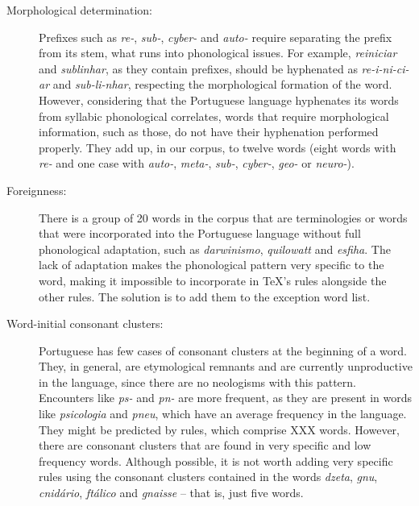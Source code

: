 \documentclass{article}
\begin{document}
\begin{description} 
    \item[Morphological determination:] Prefixes such as \emph{re-},
	\emph{sub-}, \emph{cyber-} and \emph{auto-} require separating the
	prefix from its stem, what runs into phonological issues. For example,
	\emph{reiniciar} and \emph{sublinhar}, as they contain prefixes, should
	be hyphenated as \emph{re-i-ni-ci-ar} and \emph{sub-li-nhar},
	respecting the morphological formation of the word. However,
	considering that the Portuguese language hyphenates its words from
	syllabic phonological correlates, words that require morphological
	information, such as those, do not have their hyphenation performed
	properly. They add up, in our corpus, to twelve words (eight words with
	\emph{re-} and one case with \emph{auto-}, \emph{meta-}, \emph{sub-},
	\emph{cyber-}, \emph{geo-} or \emph{neuro-}).

    \item[Foreignness:] There is a group of 20 words in the corpus that are
	terminologies or words that were incorporated into the Portuguese
	language without full phonological adaptation, such as
	\emph{darwinismo}, \emph{quilowatt} and \emph{esfiha}. The lack of
	adaptation makes the phonological pattern very specific to the word,
	making it impossible to incorporate in \TeX{}'s rules alongside the
	other rules. The solution is to add them to the exception word list.

    \item[Word-initial consonant clusters:] Portuguese has few cases of
	consonant clusters at the beginning of a word. They, in general, are
	etymological remnants and are currently unproductive in the language,
	since there are no neologisms with this pattern. Encounters like
	\emph{ps-} and \emph{pn-} are more frequent, as they are present in
	words like \emph{psicologia} and \emph{pneu}, which have an average
	frequency in the language. They might be predicted by rules, which
	comprise XXX words. However, there are consonant clusters that are
	found in very specific and low frequency words. Although possible, it
	is not worth adding very specific rules using the consonant clusters
	contained in the words \emph{dzeta}, \emph{gnu}, \emph{cnidário},
	\emph{ftálico} and \emph{gnaisse} -- that is, just five words.


\end{description}
\end{document}
